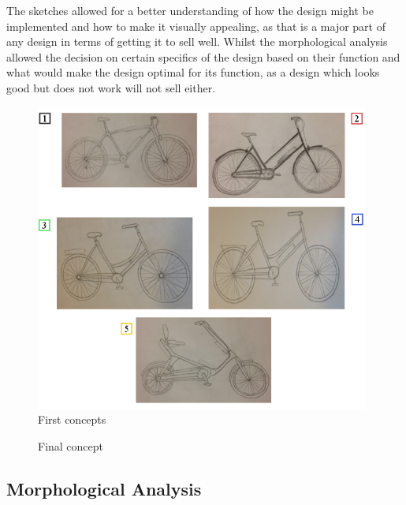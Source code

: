 \documentclass[a4paper,11pt]{article}
\begin{document}
The sketches allowed for a better understanding of how the design might be implemented and how to make it visually appealing, as that is a major part of any design in terms of getting it to sell well. Whilst the morphological analysis allowed the decision on certain specifics of the design based on their function and what would make the design optimal for its function, as a design which looks good but does not work will not sell either.

\begin{figure}[!ht]
	\centering
	\includegraphics[width=0.98\textwidth]{ske}
	\caption{First concepts}
	\label{fig:sk}
\end{figure}

\begin{figure}[!ht]
	\centering
	\caption{Final concept}
	\label{fig:fs}
\end{figure}

\newpage

\subsection{Morphological Analysis}
\end{document}
